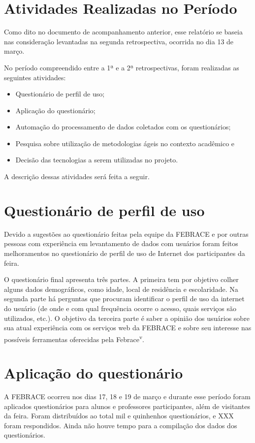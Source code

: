\documentclass[a4paper,12pt,font=plain,header=plain]{abnt}
\begin{document}
  \section{Atividades Realizadas no Período}
    Como dito no documento de acompanhamento anterior, esse relatório se baseia nas consideração levantadas na segunda retrospectiva, ocorrida no dia 13 de março.

    No período compreendido entre a 1ª e a 2ª retrospectivas, foram realizadas as seguintes atividades:
    \begin{itemize}
      \item
        Questionário de perfil de uso;
      \item
        Aplicação do questionário;
      \item
        Automação do processamento de dados coletados com os questionários;
      \item
        Pesquisa sobre utilização de metodologias ágeis no contexto acadêmico e
      \item
        Decisão das tecnologias a serem utilizadas no projeto.
    \end{itemize}

    A descrição dessas atividades será feita a seguir.

  \section{Questionário de perfil de uso}
    Devido a sugestões ao questionário feitas pela equipe da FEBRACE e por outras pessoas com experiência em levantamento de dados com usuários foram feitos melhoramentos no questionário de perfil de uso de Internet dos participantes da feira.

    O questionário final apresenta três partes. A primeira tem por objetivo colher alguns dados demográficos, como idade, local de residência e escolaridade. Na segunda parte há perguntas que procuram identificar o perfil de uso da internet do usuário (de onde e com qual frequência ocorre o acesso, quais serviços são utilizados, etc.). O objetivo da terceira parte é saber a opinião dos usuários sobre sua atual experiência com os serviços web da FEBRACE e sobre seu interesse nas possíveis ferramentas oferecidas pela Febrace\textsuperscript{v}.

  \section{Aplicação do questionário}
    A FEBRACE ocorreu nos dias 17, 18 e 19 de março e durante esse período foram aplicados questionários para alunos e professores participantes, além de visitantes da feira. Foram distribuídos ao total mil e quinhenhos questionários, e XXX foram respondidos. Ainda não houve tempo para a compilação dos dados dos questionários.
\end{document}
